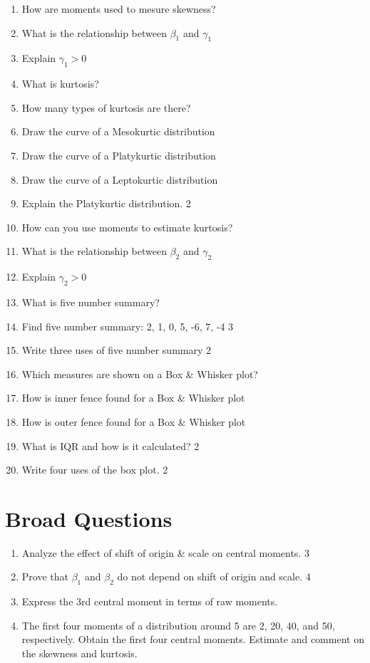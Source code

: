 \documentclass[a4paper,oneside]{book}
\begin{document}
\begin{enumerate}
    \item How are moments used to mesure skewness?
    \item What is the relationship between $\beta_1$ and $\gamma_1$
    \item Explain $\gamma_1>0$
    \item What is kurtosis?
    \item How many types of kurtosis are there?
    \item Draw the curve of a Mesokurtic distribution
    \item Draw the curve of a Platykurtic distribution
    \item Draw the curve of a Leptokurtic distribution
    \item Explain the Platykurtic distribution. \hfill 2
    \item How can you use moments to estimate kurtosis?
    \item What is the relationship between $\beta_2$ and $\gamma_2$
    \item Explain $\gamma_2>0$
    \item What is five number summary?
    \item Find five number summary: 2, 1, 0, 5, -6, 7, -4 \hfill 3
    \item Write three uses of five number summary \hfill 2
    \item Which measures are shown on a Box \& Whisker plot?
    \item How is inner fence found for a Box \& Whisker plot
    \item How is outer fence found for a Box \& Whisker plot
    \item What is IQR and how is it calculated? \hfill 2
    \item Write four uses of the box plot. \hfill 2
    \end{enumerate}

\section{Broad Questions}
    \begin{enumerate}
    \item Analyze the effect of shift of origin \& scale on central moments. \hfill 3
    \item Prove that $\beta_1$ and $\beta_2$ do not depend on shift of origin and scale. \hfill 4
    \item Express the 3rd central moment in terms of raw moments. 
    \item The first four moments of a distribution around 5 are 2, 20, 40, and 50, respectively. Obtain the first four central moments. Estimate and comment on the skewness and kurtosis. 
    \end{enumerate}
\end{document}

